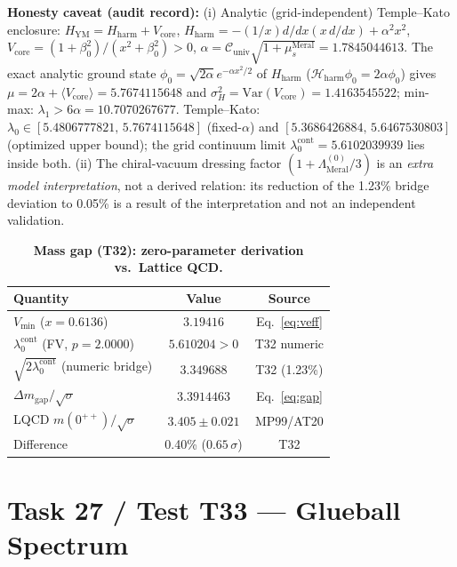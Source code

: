 \documentclass[12pt,a4paper]{article}
\begin{document}
\textbf{Honesty caveat (audit record):} (i) Analytic (grid-independent)
Temple--Kato enclosure: $H_{\mathrm{YM}}=H_{\mathrm{harm}}+V_{\mathrm{core}}$,
$H_{\mathrm{harm}}=-(1/x)d/dx(x\,d/dx)+\alpha^2x^2$,
$V_{\mathrm{core}}=(1+\beta_0^2)/(x^2+\beta_0^2)>0$,
$\alpha=\mathcal{C}_{\mathrm{univ}}\sqrt{1+\mu_s^{\mathrm{Meral}}}=1.7845044613$.
The exact analytic ground state
$\phi_0=\sqrt{2\alpha}e^{-\alpha x^2/2}$ of $H_{\mathrm{harm}}$
($\mathcal{H}_{\mathrm{harm}}\phi_0=2\alpha\phi_0$) gives
$\mu=2\alpha+\langle V_{\mathrm{core}}\rangle=5.7674115648$ and
$\sigma_H^2=\mathrm{Var}(V_{\mathrm{core}})=1.4163545522$; min-max:
$\lambda_1>6\alpha=10.7070267677$. Temple--Kato:
$\lambda_0\in[5.4806777821,\,5.7674115648]$ (fixed-$\alpha$) and
$[5.3686426884,\,5.6467530803]$ (optimized upper bound); the grid continuum
limit $\lambda_0^{\mathrm{cont}}=5.6102039939$ lies inside both. (ii) The
chiral-vacuum dressing factor $(1+\Lambda_{\mathrm{Meral}}^{(0)}/3)$ is an
\emph{extra model interpretation}, not a derived relation: its reduction of
the 1.23\% bridge deviation to 0.05\% is a result of the interpretation and
not an independent validation.

\begin{table}[!htbp]
\centering\footnotesize
\setlength{\tabcolsep}{3pt}
\caption{\textbf{Mass gap (T32): zero-parameter derivation vs.\ Lattice QCD.}}
\label{tab:gap}
\vspace{0.1cm}
\begin{tabular}{@{}l|c|c@{}}
\toprule
Quantity & Value & Source \\
\midrule
$V_{\min}$ ($x=0.6136$) & $3.19416$ & Eq.~\ref{eq:veff} \\
$\lambda_0^{\mathrm{cont}}$ (FV, $p=2.0000$) & $5.610204>0$ & T32 numeric \\
$\sqrt{2\lambda_0^{\mathrm{cont}}}$ (numeric bridge) & $3.349688$ & T32 (1.23\%) \\
$\Delta m_{\mathrm{gap}}/\sqrt{\sigma}$ & $\mathbf{3.3914463}$ & Eq.~\ref{eq:gap} \\
LQCD $m(0^{++})/\sqrt{\sigma}$ & $3.405\pm 0.021$ & MP99/AT20 \\
Difference & 0.40\% ($0.65\,\sigma$) & T32 \\
\bottomrule
\end{tabular}
\end{table}

\section{Task 27 / Test T33 --- Glueball Spectrum}
\end{document}
